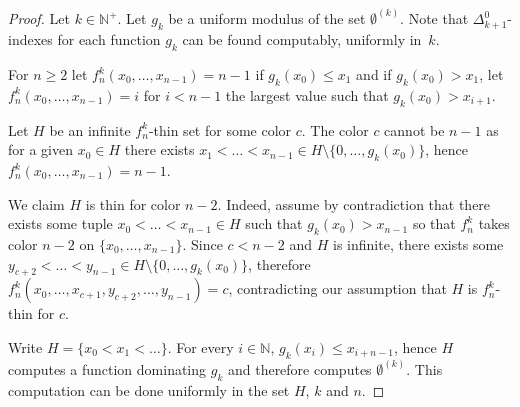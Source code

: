 \documentclass{article}
\newcommand{\NN}[0]{\mathbb{N}}
\numberwithin{theorem}{section}
\begin{document}
\begin{proof}
Let $k\in\NN^+$. Let $g_k$ be a uniform modulus of the set $\emptyset^{(k)}$. Note that $\Delta^0_{k+1}$-indexes for each function $g_k$ can be found computably, uniformly in~$k$. 

For $n \geq 2$ let $f_n^k(x_0, \dots,x_{n-1}) = n - 1$ if $g_k(x_0) \leq x_1$ and if $g_k(x_0) > x_1$, let $f_n^k(x_0, \dots,x_{n-1}) = i$ for $i < n - 1$ the largest value such that $g_k(x_0) > x_{i+1}$.

Let $H$ be an infinite $f_n^k$-thin set for some color $c$. The color $c$ cannot be $n-1$ as for a given $x_0 \in H$ there exists $x_1 <\dots < x_{n-1} \in H \setminus \{0, \dots, g_k(x_0)\}$, hence $f^k_n(x_0, \dots, x_{n-1}) = n-1$.

We claim $H$ is thin for color $n-2$. Indeed, assume by contradiction that there exists some tuple $x_0 < \dots < x_{n-1} \in H$ such that $g_k(x_0) > x_{n-1}$ so that $f^k_n$ takes color $n-2$ on $\{x_0, \dots, x_{n-1}\}$. Since $c < n-2$ and $H$ is infinite, there exists some $y_{c+2}< \dots < y_{n-1} \in H \setminus \{0, \dots ,g_k(x_0)\}$, therefore $f^k_n(x_0, \dots, x_{c+1},y_{c+2}, \dots, y_{n-1}) = c$, contradicting our assumption that $H$ is $f_n^k$-thin for $c$.

Write $H = \{x_0 < x_1 < \dots \}$. For every $i \in \NN$, $g_k(x_i) \leq x_{i + n - 1}$, hence $H$ computes a function dominating $g_k$ and therefore computes $\emptyset^{(k)}$. This computation can be done uniformly in the set $H$, $k$ and $n$. 
\end{proof}
\end{document}
